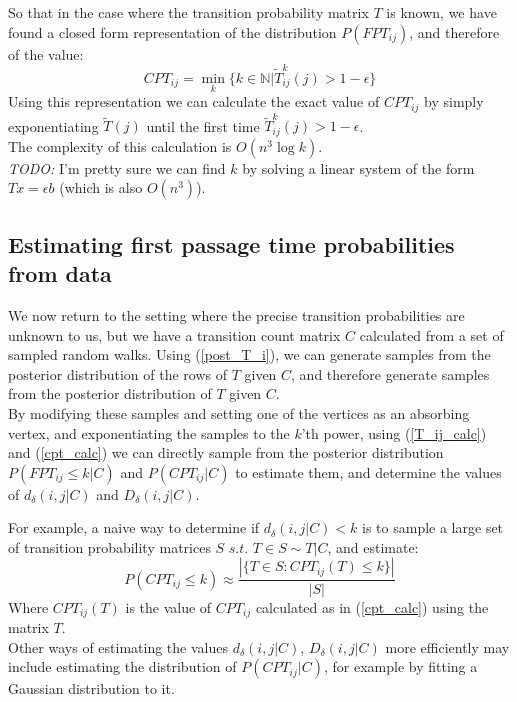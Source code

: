 \documentclass{article}
\begin{document}
So that in the case where the transition probability matrix $T$ is known, we have found a closed form representation of the distribution $P(FPT_{ij})$, and therefore of the value:
\begin{equation}\label{cpt_calc}
    CPT_{ij} = \min_{k}\{k\in \mathbb{N}| \tilde{T}_{ij}^{k}(j) > 1-\epsilon\}
\end{equation}
Using this representation we can calculate the exact value of $CPT_{ij}$ by simply exponentiating  $\tilde{T}(j)$ until the first time  $\tilde{T}_{ij}^{k}(j)>1-\epsilon$.\\
The complexity of this calculation is $O(n^3 \log k)$.\\
\textit{TODO:} I'm pretty sure we can find $k$ by solving a linear system of the form $Tx=\epsilon b$ (which is also $O(n^3)$).


\subsection{Estimating first passage time probabilities from data}
We now return to the setting where the precise transition probabilities are unknown to us, but we have a transition count matrix $C$ calculated from a set of sampled random walks. 
Using (\ref{post_T_i}), we can generate samples from the posterior distribution of the rows of $T$ given $C$, and therefore generate samples from the posterior distribution of $T$ given $C$.\\
By modifying these samples and setting one of the vertices as an absorbing vertex, and exponentiating the samples to the $k$'th power, using (\ref{T_ij_calc}) and (\ref{cpt_calc}) we can directly sample from the posterior distribution $P(FPT_{ij}\leq k|C)$ and $P(CPT_{ij}|C)$ to estimate them, and determine the values of $d_\delta(i,j|C)$ and $D_\delta(i,j|C)$.

For example, a naive way to determine if $d_\delta(i,j|C) < k$ is to sample a large set of transition probability matrices $\textit{S s.t. T}\in S \sim T|C $, and estimate:
 \begin{equation}
     P(CPT_{ij} \leq k) \approx \frac{|\{ T\in S : CPT_{ij}(T) \leq k  \}|}{|S|}
\end{equation}
Where $CPT_{ij}(T)$ is the value of  $CPT_{ij}$ calculated as in (\ref{cpt_calc}) using the matrix $T$.\\

Other ways of estimating the values $d_\delta(i,j|C)$, $D_\delta(i,j|C)$ more efficiently may include estimating the distribution of $P(CPT_{ij}|C)$, for example by fitting a Gaussian distribution to it.
\end{document}
